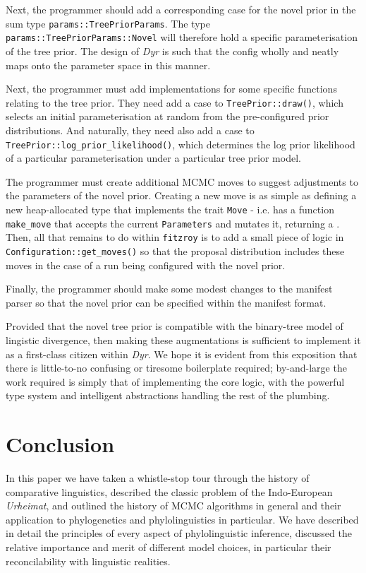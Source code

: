 \documentclass[10pt,journal,compsoc]{IEEEtran}
\begin{document}
Next, the programmer should add a corresponding case for the novel prior in the sum type \texttt{params::TreePriorParams}. The type \texttt{params::TreePriorParams::Novel} will therefore hold a specific parameterisation of the tree prior. The design of \textit{Dyr} is such that the config wholly and neatly maps onto the parameter space in this manner.

Next, the programmer must add implementations for some specific functions relating to the tree prior. They need add a case to \texttt{TreePrior::draw()}, which selects an initial parameterisation at random from the pre-configured prior distributions. And naturally, they need also add a case to \texttt{TreePrior::log\_prior\_likelihood()}, which determines the log prior likelihood of a particular parameterisation under a particular tree prior model.

The programmer must create additional MCMC moves to suggest adjustments to the parameters of the novel prior. Creating a new move is as simple as defining a new heap-allocated type that implements the trait \texttt{Move} - i.e. has a function \texttt{make\_move} that accepts the current \texttt{Parameters} and mutates it, returning a . Then, all that remains to do within \texttt{fitzroy} is to add a small piece of logic in \texttt{Configuration::get\_moves()} so that the proposal distribution includes these moves in the case of a run being configured with the novel prior.

Finally, the programmer should make some modest changes to the manifest parser so that the novel prior can be specified within the manifest format.

Provided that the novel tree prior is compatible with the binary-tree model of lingistic divergence, then making these augmentations is sufficient to implement it as a first-class citizen within \textit{Dyr}. We hope it is evident from this exposition that there is little-to-no confusing or tiresome boilerplate required; by-and-large the work required is simply that of implementing the core logic, with the powerful type system and intelligent abstractions handling the rest of the plumbing.

\section{Conclusion}

In this paper we have taken a whistle-stop tour through the history of comparative linguistics, described the classic problem of the Indo-European \textit{Urheimat}, and outlined the history of MCMC algorithms in general and their application to phylogenetics and phylolinguistics in particular. We have described in detail the principles of every aspect of phylolinguistic inference, discussed the relative importance and merit of different model choices, in particular their reconcilability with linguistic realities.
\end{document}
